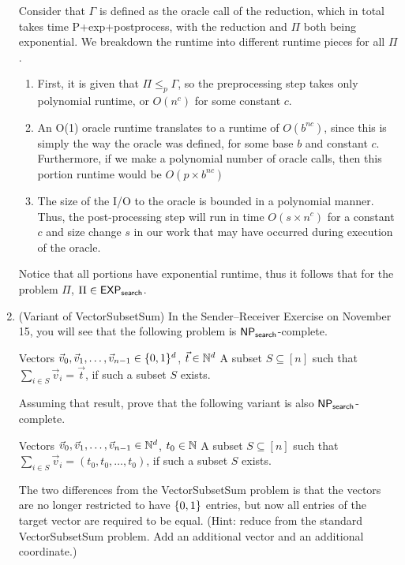 \documentclass[11pt]{article}
\begin{document}
\begin{enumerate}
    Consider that $\Gamma$ is defined as the oracle call of the reduction, which in total takes time P+exp+postprocess, with the reduction and $\Pi$ both being exponential. We breakdown the runtime into different runtime pieces for all $\Pi$. 
    
    \begin{enumerate}
        \item First, it is given that $\Pi\leq_p \Gamma$, so the preprocessing step takes only polynomial runtime, or $O(n^c)$ for some constant $c$.
        \item An O(1) oracle runtime translates to a runtime of $O(b^{nc})$, since this is simply the way the oracle was defined, for some base $b$ and constant $c$. Furthermore, if we make a polynomial number of oracle calls, then this portion runtime would be $O(p \times b^{nc})$
        \item The size of the I/O to the oracle is bounded in a polynomial manner. Thus, the post-processing step will run in time $O(s \times n^c)$ for a constant $c$ and size change $s$ in our work that may have occurred during execution of the oracle. 
    \end{enumerate}
    
    Notice that all portions have exponential runtime, thus it follows that for the problem $\Pi$, $\Pi\in \mathsf{EXP_{search}}$.
   \newpage

\item (Variant of VectorSubsetSum)  
In the Sender--Receiver Exercise on November 15, you will see that the following problem is $\mathsf{NP_{search}}$-complete.

{Vectors $\vec{v}_0,\vec{v}_1,\ldots,\vec{v}_{n-1}\in \{0,1\}^d$, $\vec{t}\in \mathbb{N}^d$}
{A subset $S\subseteq [n]$ such that $\sum_{i\in S}\vec{v}_i = \vec{t}$, if such a subset $S$ exists.}

Assuming that result, prove that the following variant is also $\mathsf{NP_{search}}$-complete.
    
{Vectors $\vec{v}_0,\vec{v}_1,\ldots,\vec{v}_{n-1}\in \mathbb{N}^d$, $t_0\in \mathbb{N}$}
{A subset $S\subseteq [n]$ such that $\sum_{i\in S}\vec{v}_i = (t_0,t_0,\ldots,t_0)$, if such a subset $S$ exists.}

    The two differences from the VectorSubsetSum problem is that the vectors are no longer restricted to have $\{0,1\}$ entries, but now all entries of the target vector are required to be equal. (Hint: reduce from the standard VectorSubsetSum problem.  Add an additional vector and an additional coordinate.) \\
    

\end{enumerate}
\end{document}
